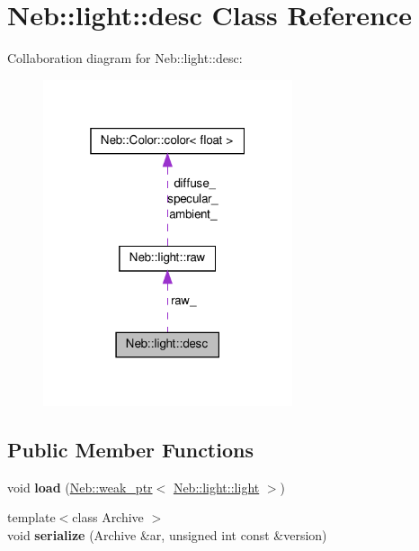 \hypertarget{classNeb_1_1light_1_1desc}{\section{\-Neb\-:\-:light\-:\-:desc \-Class \-Reference}
\label{classNeb_1_1light_1_1desc}
}


\-Collaboration diagram for \-Neb\-:\-:light\-:\-:desc\-:\nopagebreak
\begin{figure}[H]
\begin{center}
\leavevmode
\includegraphics[width=208pt]{classNeb_1_1light_1_1desc__coll__graph}
\end{center}
\end{figure}
\subsection*{\-Public \-Member \-Functions}
\begin{DoxyCompactItemize}
\item 
\hypertarget{classNeb_1_1light_1_1desc_a90019c2e1f7a3991ea87c910db373946}{void {\bfseries load} (\hyperlink{classNeb_1_1weak__ptr}{\-Neb\-::weak\-\_\-ptr}$<$ \hyperlink{classNeb_1_1light_1_1light}{\-Neb\-::light\-::light} $>$)}\label{classNeb_1_1light_1_1desc_a90019c2e1f7a3991ea87c910db373946}

\item 
\hypertarget{classNeb_1_1light_1_1desc_a4fd70a911dc2b14714989c928103cc4f}{{\footnotesize template$<$class Archive $>$ }\\void {\bfseries serialize} (\-Archive \&ar, unsigned int const \&version)}\label{classNeb_1_1light_1_1desc_a4fd70a911dc2b14714989c928103cc4f}

\end{DoxyCompactItemize}
